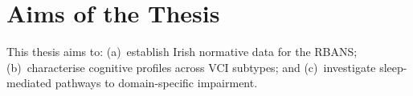\section{Aims of the Thesis}

This thesis aims to: (a)~establish Irish normative data for the RBANS;
(b)~characterise cognitive profiles across VCI subtypes; and
(c)~investigate sleep-mediated pathways to domain-specific impairment.

\thesisbibliography


